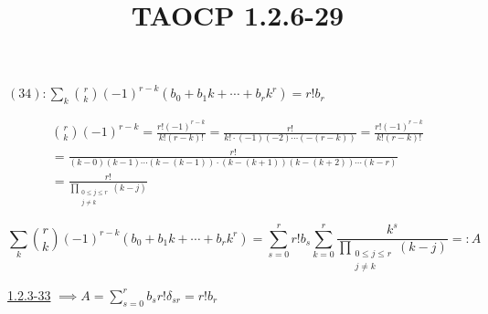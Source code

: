 \documentclass{article}
\title{TAOCP 1.2.6\mbox{-}29}
\begin{document}
\maketitle

\( (34): \sum_{k} \binom{r}{k} {(-1)}^{r-k} (b_{0} + b_{1} k + \cdots + b_{r} k^{r}) = r! b_{r} \)

\begin{multline*}
\binom{r}{k} {(-1)}^{r-k} = \frac{r!{(-1)}^{r-k}}{k!(r-k)!} = \frac{r!}{k!\cdot(-1)(-2)\cdots(-(r-k))} = \frac{r!{(-1)}^{r-k}}{k!(r-k)!} \\
= \frac{r!}{(k-0)(k-1)\cdots(k-(k-1))\cdot(k-(k+1))(k-(k+2))\cdots(k-r)} \\
= \frac{r!}{\prod_{\substack{0 \leq j \leq r\\j \neq k}}(k-j)}
\end{multline*}

\[ \sum_{k} \binom{r}{k} {(-1)}^{r-k} (b_{0} + b_{1} k + \cdots + b_{r} k^{r}) = \sum_{s=0}^{r} r! b_{s} \sum_{k=0}^{r} \frac{k^{s}}{\prod_{\substack{0 \leq j \leq r\\j \neq k}}(k-j)} =: A \]

\href{../1.2.3. Sums and Products/1.2.3-33.pdf}{1.2.3\mbox{-}33} \( \implies A = \sum_{s=0}^{r} b_{s}r! \delta_{sr} = r! b_{r} \)
\end{document}
